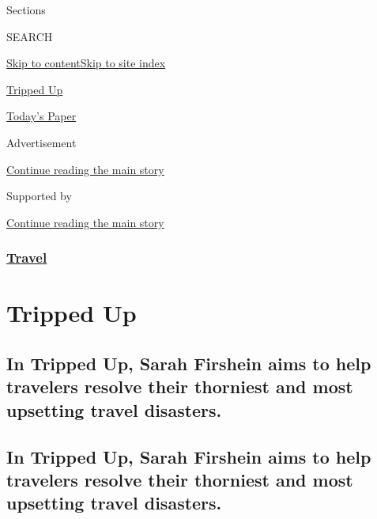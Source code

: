 Sections

SEARCH

\protect\hyperlink{site-content}{Skip to
content}\protect\hyperlink{site-index}{Skip to site index}

\href{https://www.nytimes3xbfgragh.onion/column/tripped-up}{Tripped Up}

\href{https://myaccount.nytimes3xbfgragh.onion/auth/login?response_type=cookie\&client_id=vi}{}

\href{https://www.nytimes3xbfgragh.onion/section/todayspaper}{Today's
Paper}

Advertisement

\protect\hyperlink{after-top}{Continue reading the main story}

Supported by

\protect\hyperlink{after-sponsor}{Continue reading the main story}

\hypertarget{travel}{%
\subsubsection{\texorpdfstring{\href{/section/travel}{Travel}}{Travel}}\label{travel}}

\hypertarget{tripped-up}{%
\section{Tripped Up}\label{tripped-up}}

\hypertarget{in-tripped-up-sarah-firshein-aims-to-help-travelers-resolve-their-thorniest-and-most-upsetting-travel-disasters}{%
\subsection{In Tripped Up, Sarah Firshein aims to help travelers resolve
their thorniest and most upsetting travel
disasters.}\label{in-tripped-up-sarah-firshein-aims-to-help-travelers-resolve-their-thorniest-and-most-upsetting-travel-disasters}}

\hypertarget{in-tripped-up-sarah-firshein-aims-to-help-travelers-resolve-their-thorniest-and-most-upsetting-travel-disasters-1}{%
\subsection{In Tripped Up, Sarah Firshein aims to help travelers resolve
their thorniest and most upsetting travel
disasters.}\label{in-tripped-up-sarah-firshein-aims-to-help-travelers-resolve-their-thorniest-and-most-upsetting-travel-disasters-1}}

